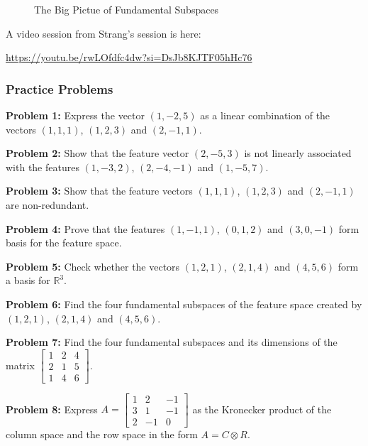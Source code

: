 \documentclass[
  letterpaper,
  DIV=11,
  numbers=noendperiod]{scrreprt}
\theoremstyle{plain}
\theoremstyle{definition}
\theoremstyle{remark}
\begin{document}
\begin{figure}


\caption{\label{fig-big-pic}The Big Pictue of Fundamental Subspaces}

\end{figure}%

A video session from Strang's session is here:

\url{https://youtu.be/rwLOfdfc4dw?si=DsJb8KJTF05hHc76}

\subsubsection{Practice Problems}\label{practice-problems-5}

\textbf{Problem 1:} Express the vector \((1,-2,5)\) as a linear
combination of the vectors \((1,1,1)\), \((1,2,3)\) and \((2,-1,1)\).

\textbf{Problem 2:} Show that the feature vector \((2,-5,3)\) is not
linearly associated with the features \((1,-3,2)\), \((2,-4,-1)\) and
\((1,-5,7)\).

\textbf{Problem 3:} Show that the feature vectors \((1,1,1)\),
\((1,2,3)\) and \((2,-1,1)\) are non-redundant.

\textbf{Problem 4:} Prove that the features \((1,-1,1)\), \((0,1,2)\)
and \((3,0,-1)\) form basis for the feature space.

\textbf{Problem 5:} Check whether the vectors \((1,2,1)\), \((2,1,4)\)
and \((4,5,6)\) form a basis for \(\mathbb{R}^3\).

\textbf{Problem 6:} Find the four fundamental subspaces of the feature
space created by \((1,2,1)\), \((2,1,4)\) and \((4,5,6)\).

\textbf{Problem 7:} Find the four fundamental subspaces and its
dimensions of the matrix
\(\begin{bmatrix}1&2&4\\2&1&5\\1&4&6\end{bmatrix}\).

\textbf{Problem 8:} Express
\(A=\begin{bmatrix}1&2&-1\\3&1&-1\\2&-1&0\end{bmatrix}\) as the
Kronecker product of the column space and the row space in the form
\(A=C\otimes R\).
\end{document}
